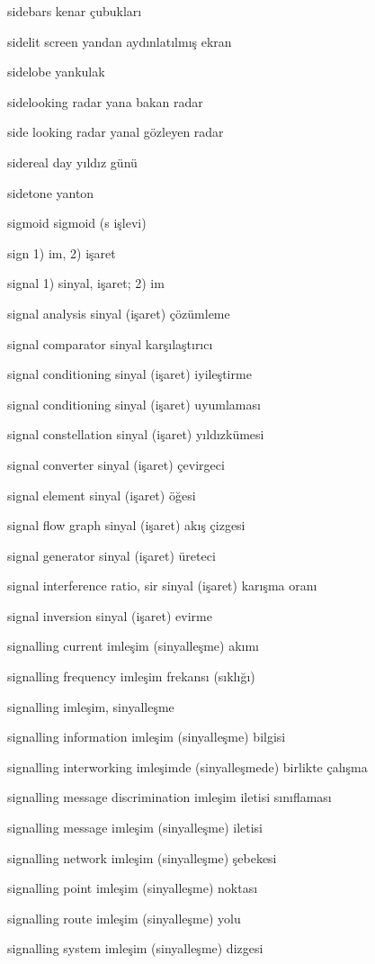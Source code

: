 \documentclass[12pt,fleqn]{article}\usepackage{../../common}
\begin{document}
sidebars kenar çubukları

sidelit screen yandan aydınlatılmış ekran

sidelobe yankulak

sidelooking radar yana bakan radar

side looking radar yanal gözleyen radar

sidereal day yıldız günü

sidetone yanton

sigmoid sigmoid (s işlevi)

sign 1) im, 2) işaret

signal 1) sinyal, işaret; 2) im

signal analysis sinyal (işaret) çözümleme

signal comparator sinyal karşılaştırıcı

signal conditioning sinyal (işaret) iyileştirme

signal conditioning sinyal (işaret) uyumlaması

signal constellation sinyal (işaret) yıldızkümesi

signal converter sinyal (işaret) çevirgeci

signal element sinyal (işaret) öğesi

signal flow graph sinyal (işaret) akış çizgesi

signal generator sinyal (işaret) üreteci

signal interference ratio, sir sinyal (işaret) karışma oranı

signal inversion sinyal (işaret) evirme

signalling current imleşim (sinyalleşme) akımı

signalling frequency imleşim frekansı (sıklığı)

signalling imleşim, sinyalleşme

signalling information imleşim (sinyalleşme) bilgisi

signalling interworking imleşimde (sinyalleşmede) birlikte çalışma

signalling message discrimination imleşim iletisi sınıflaması

signalling message imleşim (sinyalleşme) iletisi

signalling network imleşim (sinyalleşme) şebekesi

signalling point imleşim (sinyalleşme) noktası

signalling route imleşim (sinyalleşme) yolu

signalling system imleşim (sinyalleşme) dizgesi
\end{document}
